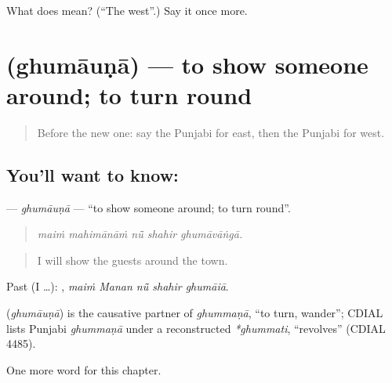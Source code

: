 \begin{tcolorbox}[breakable,colback=teal!4,colframe=teal!35!black,title={Before you move on}]
What does  mean? (\textquotedblleft{}The west\textquotedblright{}.) Say it once more.
\end{tcolorbox}
\section[\texorpdfstring{\pa{ਘੁਮਾਉਣਾ} (ghumāuṇā)}{ਘੁਮਾਉਣਾ (ghumāuṇā)}]{ (ghumāuṇā) — to show someone around; to turn round}

\label{lesson:PA-C271-ghumauna}



\begin{quote}
Before the new one: say the Punjabi for east, then the Punjabi for west.
\end{quote}

\subsection*{You'll want to know: }
\textbf{} — \emph{ghumāuṇā} — \textquotedblleft{}to show someone around; to turn round\textquotedblright{}.

\begin{quote}
    
\end{quote}

\begin{quote}
\emph{maiṁ mahimānāṁ nū̃ shahir ghumāvāṅgā.}
\end{quote}

\begin{quote}
I will show the guests around the town.
\end{quote}

Past (I …):     , \emph{maiṁ Manan nū̃ shahir ghumāiā}.

\begin{cousinweb}
\textbf{} (\emph{ghumāuṇā}) is the causative partner of \emph{ghummaṇā}, \textquotedblleft{}to turn, wander\textquotedblright{}; CDIAL lists Punjabi \emph{ghummaṇā} under a reconstructed \emph{*ghummati}, \textquotedblleft{}revolves\textquotedblright{} (CDIAL 4485).
\end{cousinweb}

\begin{grammarlens}[title={What you've built}]
One more word for this chapter.
\end{grammarlens}

